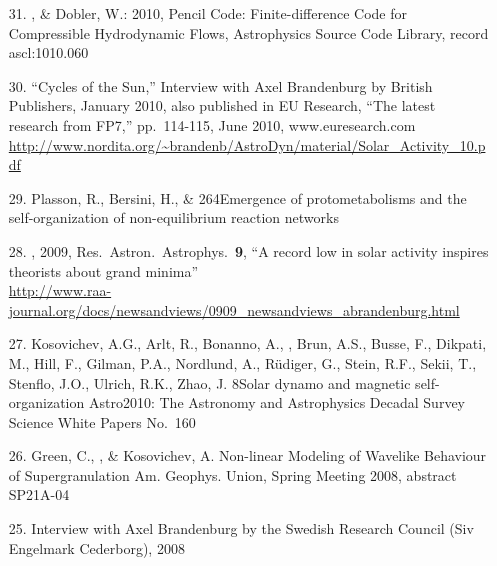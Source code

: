 \begin{itemize}
\item[31.]
\Brandenburg, \& Dobler, W.: 2010,
Pencil Code: Finite-difference Code for Compressible Hydrodynamic Flows,
Astrophysics Source Code Library, record ascl:1010.060

\item[30.]
``Cycles of the Sun,''
Interview with Axel Brandenburg by British Publishers, January 2010,
also published in EU Research, ``The latest research from FP7,''
pp.\ 114-115, June 2010, www.euresearch.com\\
\url{http://www.nordita.org/~brandenb/AstroDyn/material/Solar_Activity_10.pdf}%

\item[29.]
Plasson, R., Bersini, H., \& \Brandenburg{}
{264}{Emergence of protometabolisms and the self-organization of
non-equilibrium reaction networks}

\item[28.]
\Brandenburg, 2009, Res.\ Astron.\ Astrophys.\ {\bf 9},
``A record low in solar activity inspires theorists about grand minima''
\\
\url{http://www.raa-journal.org/docs/newsandviews/0909_newsandviews_abrandenburg.html}

\item[27.]
Kosovichev, A.G., Arlt, R., Bonanno, A., \Brandenburg, Brun,
A.S., Busse, F., Dikpati, M., Hill, F., Gilman, P.A., Nordlund, A.,
R\"udiger, G., Stein, R.F., Sekii, T., Stenflo, J.O., Ulrich, R.K.,
Zhao, J.
{8}{Solar dynamo and magnetic self-organization}
{Astro2010: The Astronomy and Astrophysics Decadal Survey}
{Science White Papers}
{No.\ 160}

\item[26.]
Green, C., \Brandenburg, \& Kosovichev, A.
{Non-linear Modeling of Wavelike Behaviour of Supergranulation}
{Am. Geophys. Union, Spring Meeting 2008, abstract SP21A-04}

\item[25.]
Interview with Axel Brandenburg by the Swedish Research Council
(Siv Engelmark Cederborg), 2008


\end{itemize}
